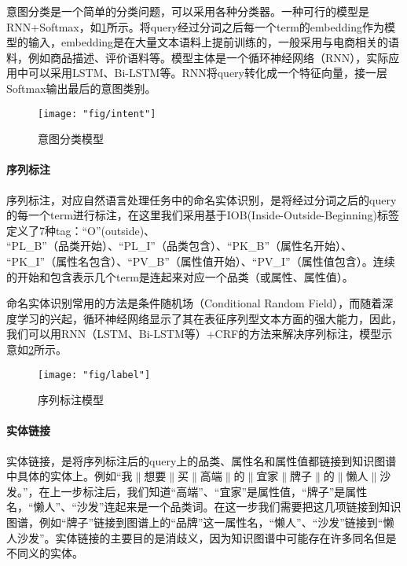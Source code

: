 意图分类是一个简单的分类问题，可以采用各种分类器。一种可行的模型是RNN+Softmax，如\ref{fig:intent}所示。将query经过分词之后每一个term的embedding作为模型的输入，embedding是在大量文本语料上提前训练的，一般采用与电商相关的语料，例如商品描述、评价语料等。模型主体是一个循环神经网络（RNN），实际应用中可以采用LSTM、Bi-LSTM等。RNN将query转化成一个特征向量，接一层Softmax输出最后的意图类别。

\begin{figure}[th]
	\centering
	\texttt{[image: "fig/intent"]}
	\caption{意图分类模型}
	\label{fig:intent}
\end{figure}


\paragraph{序列标注}

序列标注，对应自然语言处理任务中的命名实体识别，是将经过分词之后的query的每一个term进行标注，在这里我们采用基于IOB(Inside-Outside-Beginning)标签定义了7种tag：“O”(outside)、\\“PL\_B”（品类开始）、“PL\_I”（品类包含）、“PK\_B”（属性名开始）、\\“PK\_I”（属性名包含）、“PV\_B”（属性值开始）、“PV\_I”（属性值包含）。连续的开始和包含表示几个term是连起来对应一个品类（或属性、属性值）。

命名实体识别常用的方法是条件随机场（Conditional Random Field），而随着深度学习的兴起，循环神经网络显示了其在表征序列型文本方面的强大能力，因此，我们可以用RNN（LSTM、Bi-LSTM等）+CRF的方法来解决序列标注，模型示意如\ref{fig:label}所示。

\begin{figure}[th]
	\centering
	\texttt{[image: "fig/label"]}
	\caption{序列标注模型}
	\label{fig:label}
\end{figure}


\paragraph{实体链接}

实体链接，是将序列标注后的query上的品类、属性名和属性值都链接到知识图谱中具体的实体上。例如“我$\|$想要$\|$买$\|$高端$\|$的$\|$宜家$\|$牌子$\|$的$\|$懒人$\|$沙发。”，在上一步标注后，我们知道“高端”、“宜家”是属性值，“牌子”是属性名，“懒人”、“沙发”连起来是一个品类词。在这一步我们需要把这几项链接到知识图谱，例如“牌子”链接到图谱上的“品牌”这一属性名，“懒人”、“沙发”链接到“懒人沙发”。实体链接的主要目的是消歧义，因为知识图谱中可能存在许多同名但是不同义的实体。


